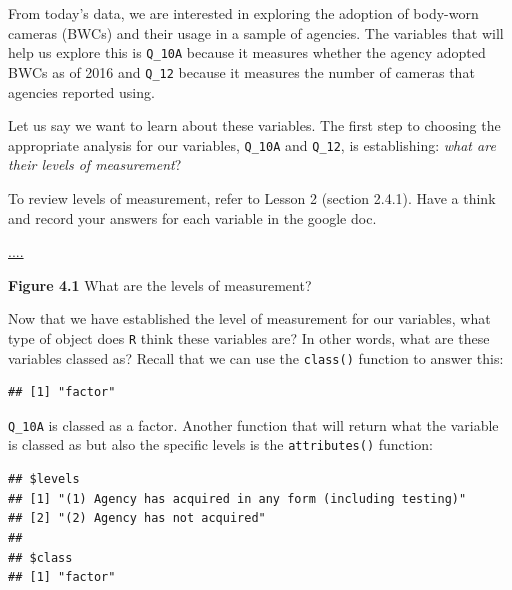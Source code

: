 \documentclass[
]{book}
\newenvironment{Shaded}{\begin{snugshade}}{\end{snugshade}}
\newcommand{\CommentTok}[1]{\textcolor[rgb]{0.56,0.35,0.01}{\textit{#1}}}
\newcommand{\FunctionTok}[1]{\textcolor[rgb]{0.00,0.00,0.00}{#1}}
\newcommand{\NormalTok}[1]{#1}
\newcommand{\SpecialCharTok}[1]{\textcolor[rgb]{0.00,0.00,0.00}{#1}}
\begin{document}
From today's data, we are interested in exploring the adoption of body-worn cameras (BWCs) and their usage in a sample of agencies. The variables that will help us explore this is \texttt{Q\_10A} because it measures whether the agency adopted BWCs as of 2016 and \texttt{Q\_12} because it measures the number of cameras that agencies reported using.

Let us say we want to learn about these variables. The first step to choosing the appropriate analysis for our variables, \texttt{Q\_10A} and \texttt{Q\_12}, is establishing: \emph{what are their levels of measurement}?

To review levels of measurement, refer to Lesson 2 (section 2.4.1). Have a think and record your answers for each variable in the google doc.

\url{....}

\textbf{Figure 4.1} What are the levels of measurement?

Now that we have established the level of measurement for our variables, what type of object does \texttt{R} think these variables are? In other words, what are these variables classed as? Recall that we can use the \texttt{class()} function to answer this:

\begin{Shaded}
\end{Shaded}

\begin{verbatim}
## [1] "factor"
\end{verbatim}

\texttt{Q\_10A} is classed as a factor. Another function that will return what the variable is classed as but also the specific levels is the \texttt{attributes()} function:

\begin{Shaded}
\end{Shaded}

\begin{verbatim}
## $levels
## [1] "(1) Agency has acquired in any form (including testing)"
## [2] "(2) Agency has not acquired"                            
## 
## $class
## [1] "factor"
\end{verbatim}
\end{document}
